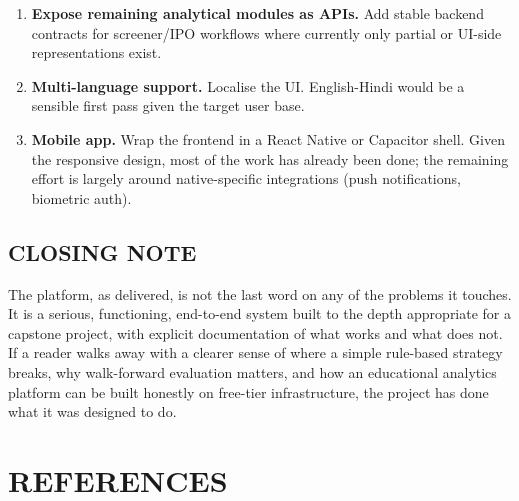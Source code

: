 \documentclass[12pt,a4paper]{report}
\numberwithin{equation}{chapter}
\begin{document}
\begin{enumerate}
  \item \textbf{Expose remaining analytical modules as APIs.} Add stable backend contracts for screener/IPO workflows where currently only partial or UI-side representations exist.
  \item \textbf{Multi-language support.} Localise the UI. English-Hindi would be a sensible first pass given the target user base.
  \item \textbf{Mobile app.} Wrap the frontend in a React Native or Capacitor shell. Given the responsive design, most of the work has already been done; the remaining effort is largely around native-specific integrations (push notifications, biometric auth).
\end{enumerate}

\section{CLOSING NOTE}

The platform, as delivered, is not the last word on any of the problems it touches. It is a serious, functioning, end-to-end system built to the depth appropriate for a capstone project, with explicit documentation of what works and what does not. If a reader walks away with a clearer sense of where a simple rule-based strategy breaks, why walk-forward evaluation matters, and how an educational analytics platform can be built honestly on free-tier infrastructure, the project has done what it was designed to do.

\chapter*{REFERENCES}
\end{document}
